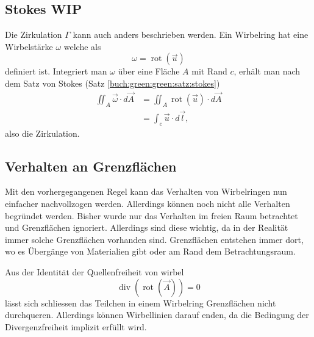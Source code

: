 \subsection{Stokes WIP \label{paper:Wirbelringe:Stokes}}

Die Zirkulation \(\Gamma\) kann auch anders beschrieben werden. 
Ein Wirbelring hat eine Wirbelstärke \(\omega\) welche als
\[
\omega
=
\operatorname{rot}\left( \vec{u} \right)
\]
definiert ist.
Integriert man $\omega$ über eine Fläche \(A\) mit Rand \(c\), erhält man nach dem Satz von Stokes (Satz \ref{buch:green:green:satz:stokes})
\begin{align*}
\iint_{A} \vec{\omega} \cdot d \vec{A}
&=
\iint_{A} \operatorname{rot}\left(\vec{u}\right)\cdot  d \vec{A}\\
&=
\int_{c} \vec{u} \cdot d\vec{l},
\end{align*}
also die Zirkulation.

\subsection{Verhalten an Grenzflächen \label{paper:Wirbelringe:Grenzflaechen}}

Mit den vorhergegangenen Regel kann das Verhalten von Wirbelringen nun einfacher nachvollzogen werden. 
Allerdings können noch nicht alle Verhalten begründet werden. 
Bisher wurde nur das Verhalten im freien Raum betrachtet und Grenzflächen ignoriert. 
Allerdings sind diese wichtig, da in der Realität immer solche Grenzflächen vorhanden sind. 
Grenzflächen entstehen immer dort, wo es Übergänge von Materialien gibt oder am Rand dem Betrachtungsraum.

Aus der Identität der Quellenfreiheit von wirbel 
\[
\operatorname{div} \left( \operatorname{rot} \left( \vec{A} \right) \right) 
= 
0
\]
lässt sich schliessen das Teilchen in einem Wirbelring Grenzflächen nicht durchqueren. 
Allerdings können Wirbellinien darauf enden, da die Bedingung der Divergenzfreiheit implizit erfüllt wird. 
